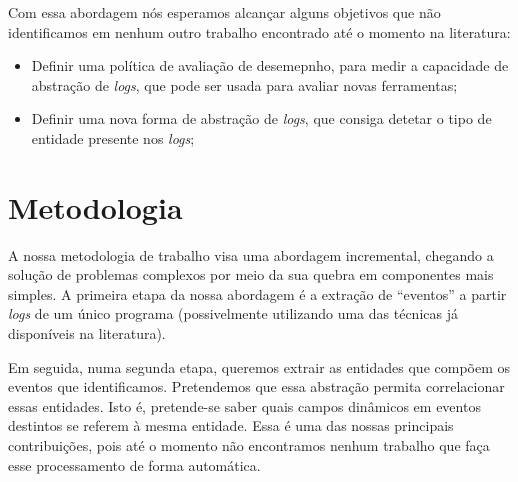 \documentclass[
	12pt,				%
	openright,			%
	twoside,			%
	a4paper,			%
	english,			%
	spanish,			%
	brazil,				%
	]{abntex2}
\begin{document}
Com essa abordagem nós esperamos alcançar alguns objetivos que não identificamos em nenhum outro trabalho encontrado até o momento na literatura:

\begin{itemize}
	\item Definir uma política de avaliação de desemepnho, para medir a capacidade de abstração de \emph{logs}, que pode ser usada para avaliar novas ferramentas;
	\item Definir uma nova forma de abstração de \emph{logs}, que consiga detetar o tipo de entidade presente nos \emph{logs};
\end{itemize}

\section{Metodologia}

%
%
%
%

A nossa metodologia de trabalho visa uma abordagem incremental, chegando a solução de problemas complexos por meio da sua quebra em componentes mais simples. A primeira etapa da nossa abordagem é a extração de ``eventos'' a partir \emph{logs} de um único programa (possivelmente utilizando uma das técnicas já disponíveis na literatura).

Em seguida, numa segunda etapa, queremos extrair as entidades que compõem os eventos que identificamos. Pretendemos que essa abstração permita correlacionar essas entidades. Isto é, pretende-se saber quais campos dinâmicos em eventos destintos se referem à mesma entidade. Essa é uma das nossas principais contribuições, pois até o momento não encontramos nenhum trabalho que faça esse processamento de forma automática.
\end{document}
